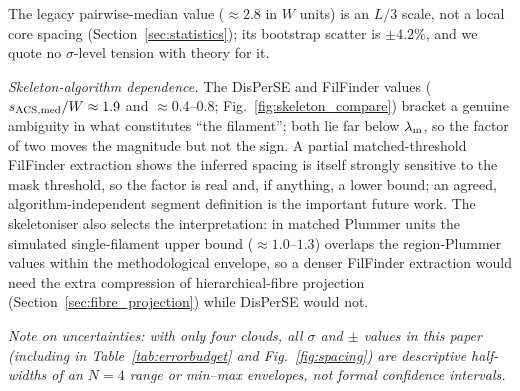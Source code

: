 \documentclass[usenatbib,twoside,twocolumn]{mnras}
\begin{document}
The legacy pairwise-median value ($\approx2.8$ in $W$ units) is an $L/3$ scale, not a local core spacing (Section~\ref{sec:statistics}); its bootstrap scatter is $\pm4.2\%$, and we quote no $\sigma$-level tension with theory for it.

\emph{Skeleton-algorithm dependence.} The DisPerSE and FilFinder values ($s_{\rm ACS,med}/W\approx1.9$ and $\approx0.4$--$0.8$; Fig.~\ref{fig:skeleton_compare}) bracket a genuine ambiguity in what constitutes ``the filament''; both lie far below $\lambda_{\rm m}$, so the factor of two moves the magnitude but not the sign. A partial matched-threshold FilFinder extraction shows the inferred spacing is itself strongly sensitive to the mask threshold, so the factor is real and, if anything, a lower bound; an agreed, algorithm-independent segment definition is the important future work. The skeletoniser also selects the interpretation: in matched Plummer units the simulated single-filament upper bound ($\approx1.0$--$1.3$) overlaps the region-Plummer values within the methodological envelope, so a denser FilFinder extraction would need the extra compression of hierarchical-fibre projection (Section~\ref{sec:fibre_projection}) while DisPerSE would not.

\noindent\emph{Note on uncertainties: with only four clouds, all $\sigma$ and $\pm$ values in this paper (including in Table~\ref{tab:errorbudget} and Fig.~\ref{fig:spacing}) are descriptive half-widths of an $N=4$ range or min--max envelopes, not formal confidence intervals.}
\end{document}
